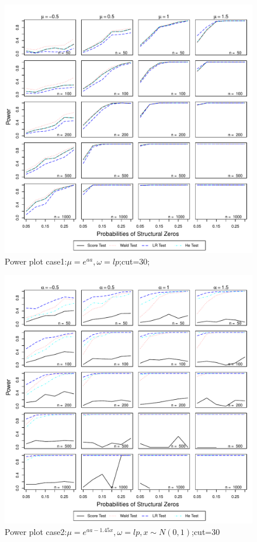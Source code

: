 \documentclass[11pt]{article}
\numberwithin{equation}{section}
\begin{document}

\begin{figure}
  \centering
  \includegraphics[width=\columnwidth]{./figure/p/p301.pdf}
  \caption{Power plot case1:$\mu=e^{aa},\omega=lp$;cut=30;}
\end{figure}

\begin{figure}
  \centering
  \includegraphics[width=\columnwidth]{./figure/p/p302.pdf}
  \caption{Power plot case2:$\mu=e^{aa-1.45x},\omega=lp,x\sim N(0,1)$;cut=30}
\end{figure}
\end{document}
